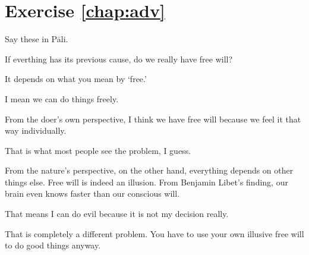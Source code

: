 \section*{Exercise \ref{chap:adv}}
Say these in P\=ali.
\begin{compactenum}
\item If everthing has its previous cause, do we really have free will?
\item It depends on what you mean by `free.'
\item I mean we can do things freely.
\item From the doer's own perspective, I think we have free will because we feel it that way individually.
\item That is what most people see the problem, I guess.
\item From the nature's perspective, on the other hand, everything depends on other things else. Free will is indeed an illusion. From Benjamin Libet's finding, our brain even knows faster than our conscious will.
\item That means I can do evil because it is not my decision really.
\item That is completely a different problem. You have to use your own illusive free will to do good things anyway.
\end{compactenum}
